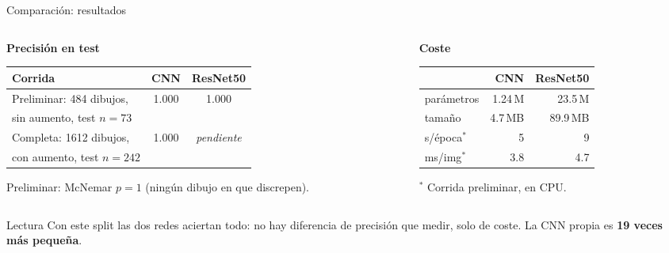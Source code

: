 \documentclass[aspectratio=169,11pt]{beamer}
\begin{document}
\begin{frame}{Comparación: resultados}
  \begin{columns}[T]
    \begin{column}{0.55\textwidth}
      \textbf{Precisión en test}

      \smallskip
      \small
      \begin{tabular}{lcc}
        \toprule
        Corrida & CNN & ResNet50 \\
        \midrule
        Preliminar: 484 dibujos, & \multirow{2}{*}{1.000} & \multirow{2}{*}{1.000} \\[-2pt]
        \quad sin aumento, test $n=73$ & & \\
        Completa: 1612 dibujos, & \multirow{2}{*}{1.000} & \multirow{2}{*}{\emph{pendiente}} \\[-2pt]
        \quad con aumento, test $n=242$ & & \\
        \bottomrule
      \end{tabular}

      \medskip
      Preliminar: McNemar $p = 1$ (ningún dibujo en que discrepen).
    \end{column}
    \begin{column}{0.42\textwidth}
      \textbf{Coste}

      \smallskip
      \small
      \begin{tabular}{lrr}
        \toprule
         & CNN & ResNet50 \\
        \midrule
        parámetros   & 1.24\,M & 23.5\,M \\
        tamaño       & 4.7\,MB & 89.9\,MB \\
        s/época$^{*}$ & 5 & 9 \\
        ms/img$^{*}$  & 3.8 & 4.7 \\
        \bottomrule
      \end{tabular}

      \smallskip
      \scriptsize $^{*}$ Corrida preliminar, en CPU.
    \end{column}
  \end{columns}

  \bigskip
  \begin{exampleblock}{Lectura}
    \small Con este split las dos redes aciertan todo: no hay diferencia de precisión que medir, solo de coste. La CNN propia es \textbf{19 veces más pequeña}.
  \end{exampleblock}
\end{frame}
\end{document}
